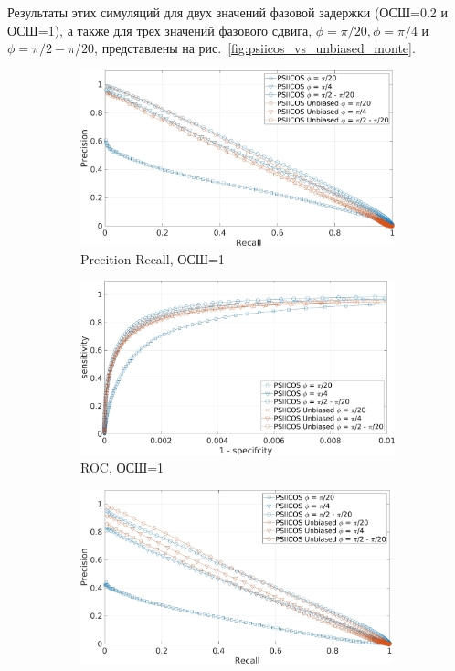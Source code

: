 Результаты этих симуляций для двух значений фазовой задержки (ОСШ=0.2 и ОСШ=1),
а также для трех значений фазового сдвига, $\phi = \pi/20, \phi = \pi/4$ и $\phi=\pi/2 - \pi/20$,
представлены на рис.~\ref{fig:psiicos_vs_unbiased_monte}.

\begin{figure}[htbp]
    \begin{subfigure}[t]{0.5\textwidth}
        \includegraphics[width=1\textwidth]{../images/pre_rec_snr_1.jpg}
        \caption{Precition-Recall, ОСШ=1}\label{fig:psiicos_vs_unbiased_monte_a}
    \end{subfigure}
        \hspace{-1.5cm}
    \begin{subfigure}[t]{0.5\textwidth}
        \includegraphics[width=1\textwidth]{../images/roc_snr_1.jpg}
        \caption{ROC, ОСШ=1}\label{fig:psiicos_vs_unbiased_monte_b}
    \end{subfigure}
    \hspace{-2cm}
    \begin{subfigure}[t]{0.5\textwidth}
        \includegraphics[width=0.99\textwidth]{../images/pre_rec_snr_02.jpg}

\end{subfigure}
\end{figure}
